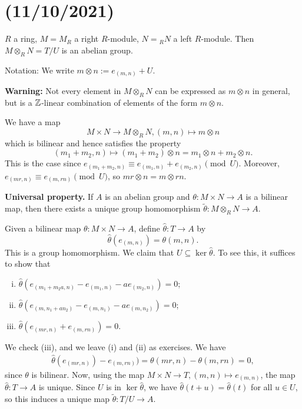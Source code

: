 \section{(11/10/2021)}
$R$ a ring, $M = M_R$ a right $R$-module, $N = {}_R N$
a left $R$-module. Then $M \otimes_R N = T/U$ is an abelian group. 

Notation: We write $m \otimes n := e_{(m,n)} + U$. 

{\bf Warning:} Not every element in $M \otimes_R N$ can be expressed as 
$m \otimes n$ in general, but is a $\mathbb{Z}$-linear combination of 
elements of the form $m \otimes n$. 

We have a map 
\[ M \times N \to M \otimes_R N, (m, n) \mapsto m \otimes n \] 
which is bilinear and hence satisfies the property 
\[ (m_1 + m_2, n) \mapsto (m_1 + m_2) \otimes n = 
m_1 \otimes n + m_2 \otimes n. \] 
This is the case since $e_{(m_1+m_2, n)} \equiv e_{(m_1, n)} 
+ e_{(m_2, n)} \pmod{U}$. Moreover, $e_{(mr, n)} \equiv 
e_{(m, rn)} \pmod{U}$, so $mr \otimes n = m \otimes rn$. 

{\bf Universal property.} If $A$ is an abelian group and 
$\theta : M \times N \to A$ is a bilinear map, then there exists 
a unique group homomorphism $\tilde\theta : M \otimes_R N \to A$. 

\begin{pf}
    Given a bilinear map $\theta : M \times N \to A$, define 
    $\hat\theta : T \to A$ by 
    \[ \hat\theta(e_{(m,n)}) = \theta(m, n). \] 
    This is a group homomorphism. We claim that $U \subseteq 
    \ker\hat\theta$. To see this, it suffices to show that 
    \begin{enumerate}[(i)]
        \item $\hat\theta(e_{(m_1+m_2a, n)} - e_{(m_1, n)} 
        - ae_{(m_2, n)}) = 0$; 
        \item $\hat\theta(e_{(m,n_1+an_2)} - e_{(m,n_1)} - 
        ae_{(m,n_2)}) = 0$; 
        \item $\hat\theta(e_{(mr, n)} + e_{(m, rn)}) = 0$. 
    \end{enumerate}
    We check (iii), and we leave (i) and (ii) as exercises. 
    We have 
    \begin{align*}
        \hat\theta(e_{(mr, n)}) - e_{(m, rn)}) = 
        \theta(mr, n) - \theta(m, rn) = 0, 
    \end{align*}
    since $\theta$ is bilinear. Now, using the map 
    $M \times N \to T, (m, n) \mapsto e_{(m, n)}$, the 
    map $\hat\theta : T \to A$ is unique. Since $U$ is 
    in $\ker\hat\theta$, we have $\hat\theta(t + u) = 
    \hat\theta(t)$ for all $u \in U$, so this 
    induces a unique map $\tilde\theta : T/U \to A$. 
\end{pf}

